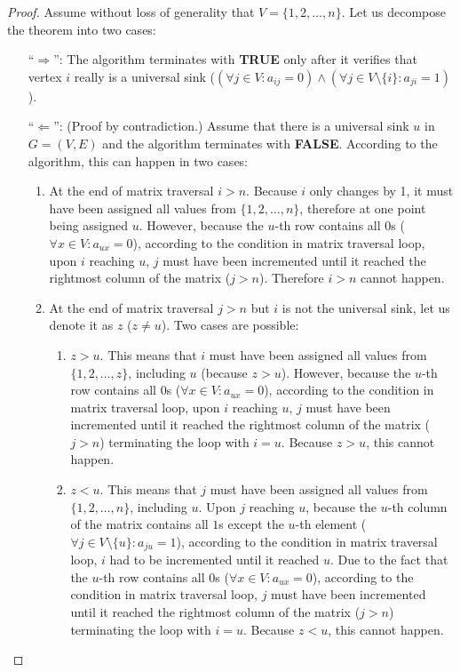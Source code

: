 \begin{proof}
Assume without loss of generality that $V = \{1, 2, \dots, n\}$. Let us
decompose the theorem into two cases:

\begin{itemize}

  \item[``$\Rightarrow$'':] The algorithm terminates with \textbf{TRUE} only
  after it verifies that vertex $i$ really is a universal sink ($(\forall j \in
  V : a_{ij} = 0) \wedge (\forall j \in V \setminus \{i\} : a_{ji} = 1)$).

  \item[``$\Leftarrow$'':] (Proof by contradiction.) Assume that there is a
  universal sink $u$ in $G = (V, E)$ and the algorithm terminates with
  \textbf{FALSE}. According to the algorithm, this can happen in two cases:

  \begin{enumerate}

    \item At the end of matrix traversal $i > n$. Because $i$ only changes by
    1, it must have been assigned all values from $\{1, 2, \dots, n\}$,
    therefore at one point being assigned $u$. However, because the $u$-th row
    contains all $0$s ($\forall x \in V : a_{ux} = 0$), according to the
    condition in matrix traversal loop, upon $i$ reaching $u$, $j$ must have
    been incremented until it reached the rightmost column of the matrix ($j
    > n$). Therefore $i > n$ cannot happen.

    \item At the end of matrix traversal $j > n$ but $i$ is not the universal
    sink, let us denote it as $z$ ($z \ne u$). Two cases are possible:

    \begin{enumerate}

      \item $z > u$. This means that $i$ must have been assigned all values
      from $\{1, 2, \dots, z\}$, including $u$ (because $z > u$). However,
      because the $u$-th row contains all $0$s ($\forall x \in V : a_{ux}
      = 0$), according to the condition in matrix traversal loop, upon $i$
      reaching $u$, $j$ must have been incremented until it reached the
      rightmost column of the matrix ($j > n$) terminating the loop with $i
      = u$. Because $z > u$, this cannot happen.

      \item $z < u$. This means that $j$ must have been assigned all values
      from $\{1, 2, \dots, n\}$, including $u$. Upon $j$ reaching $u$, because
      the $u$-th column of the matrix contains all $1$s except the $u$-th
      element ($\forall j \in V \setminus \{u\} : a_{ju} = 1$), according to
      the condition in matrix traversal loop, $i$ had to be incremented until
      it reached $u$. Due to the fact that the $u$-th row contains all $0$s
      ($\forall x \in V : a_{ux} = 0$), according to the condition in matrix
      traversal loop, $j$ must have been incremented until it reached the
      rightmost column of the matrix ($j > n$) terminating the loop with $i
      = u$. Because $z < u$, this cannot happen.


\end{enumerate}
\end{enumerate}
\end{itemize}
\end{proof}
